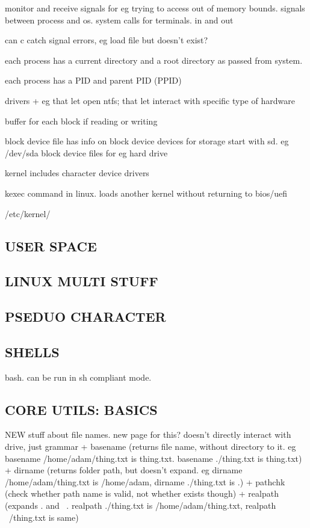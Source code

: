 monitor and receive signals for eg trying to access out of memory bounds. signals between process and os. system calls for terminals. in and out

can c catch signal errors, eg load file but doesn't exist?



each process has a current directory and a root directory as passed from system.

each process has a PID and parent PID (PPID)

drivers
+ eg that let open ntfs; that let interact with specific type of hardware

buffer for each block if reading or writing

block device file has info on block device
devices for storage start with sd. eg /dev/sda
block device files for eg hard drive

kernel includes character device drivers

kexec command in linux. loads another kernel without returning to bios/uefi

/etc/kernel/

\subsection{USER SPACE}

\subsection{LINUX MULTI STUFF}

\subsection{PSEDUO CHARACTER}

\subsection{SHELLS}

bash. can be run in sh compliant mode.

\subsection{CORE UTILS: BASICS}

NEW stuff about file names. new page for this? doesn't directly interact with drive, just grammar
+ basename (returns file name, without directory to it. eg basename /home/adam/thing.txt is thing.txt. basename ./thing.txt is thing.txt)
+ dirname (returns folder path, but doesn't expand. eg dirname /home/adam/thing.txt is /home/adam, dirname ./thing.txt is .)
+ pathchk (check whether path name is valid, not whether exists though)
+ realpath (expands . and ~. realpath ./thing.txt is /home/adam/thing.txt, realpath ~/thing.txt is same)

